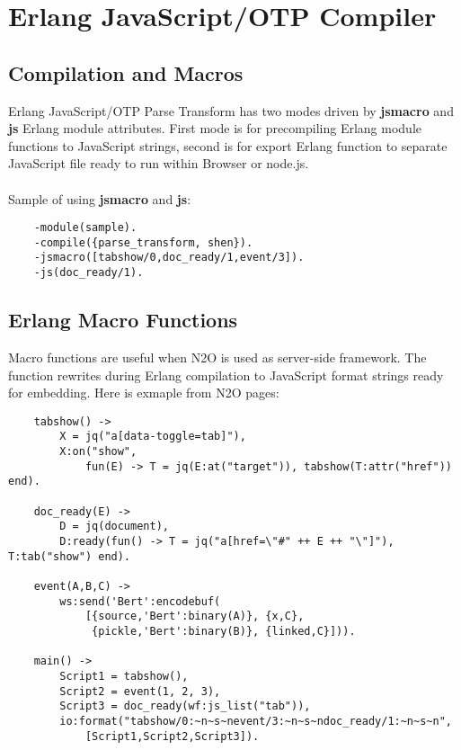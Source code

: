 \section{Erlang JavaScript/OTP Compiler}

\subsection{Compilation and Macros}
Erlang JavaScript/OTP Parse Transform has two modes driven
by {\bf \-jsmacro} and {\bf \-js} Erlang module attributes.
First mode is for precompiling Erlang module functions
to JavaScript strings, second is for export Erlang function
to separate JavaScript file ready to run within Browser or node.js.

\paragraph{}
Sample of using {\bf \-jsmacro} and {\bf \-js}:

\vspace{1\baselineskip}
\begin{lstlisting}
    -module(sample).
    -compile({parse_transform, shen}).
    -jsmacro([tabshow/0,doc_ready/1,event/3]).
    -js(doc_ready/1).
\end{lstlisting}

\subsection{Erlang Macro Functions}
Macro functions are useful when N2O is used as server-side framework.
The function rewrites during Erlang compilation to JavaScript format
strings ready for embedding. Here is exmaple from N2O pages:

\begin{lstlisting}
    tabshow() ->
        X = jq("a[data-toggle=tab]"),
        X:on("show", 
            fun(E) -> T = jq(E:at("target")), tabshow(T:attr("href")) end).

    doc_ready(E) ->
        D = jq(document),
        D:ready(fun() -> T = jq("a[href=\"#" ++ E ++ "\"]"), T:tab("show") end).

    event(A,B,C) ->
        ws:send('Bert':encodebuf(
            [{source,'Bert':binary(A)}, {x,C},
             {pickle,'Bert':binary(B)}, {linked,C}])).

    main() ->
        Script1 = tabshow(),
        Script2 = event(1, 2, 3),
        Script3 = doc_ready(wf:js_list("tab")),
        io:format("tabshow/0:~n~s~nevent/3:~n~s~ndoc_ready/1:~n~s~n",
            [Script1,Script2,Script3]).
\end{lstlisting}
\vspace{1\baselineskip}

